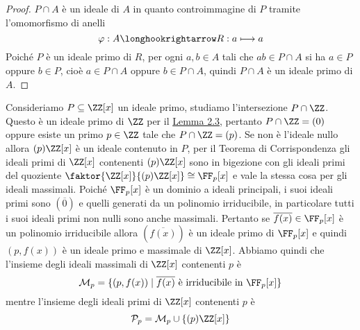 \documentclass[11pt]{scrartcl}
\begin{document}
\begin{proof}
    $P\cap A$ è un ideale di $A$ in quanto controimmagine di $P$ tramite
    l'omomorfismo di anelli
    \[
        \varphi: A \longhookrightarrow R: a \longmapsto a
    \]
    Poiché $P$ è un ideale primo di $R$, per ogni $a, b \in A$ tali che 
    $ab \in P\cap A$ si ha $a \in P$
    oppure $b \in P$, cioè $a \in P \cap A$ oppure $b \in P\cap A$, quindi
    $P \cap A$ è un ideale primo di $A$.
\end{proof}


Consideriamo $P \subseteq \ZZ[x]$ un ideale primo, studiamo l'intersezione
$P \cap \ZZ$. Questo è un ideale primo di $\ZZ$ per il 
\hyperref[lemma2.3]{Lemma 2.3}, pertanto $P\cap \ZZ = (0)$ oppure esiste un
primo $p \in \ZZ$ tale che $P\cap\ZZ = (p)$. Se non è l'ideale nullo allora
$(p)\ZZ[x]$ è un ideale contenuto in $P$, per il Teorema di 
Corrispondenza gli ideali primi di $\ZZ[x]$ contenenti $(p)\ZZ[x]$ sono in 
bigezione con gli ideali primi del quoziente $\faktor{\ZZ[x]}{(p)\ZZ[x]} \cong \FF_p[x]$
e vale la stessa cosa per gli ideali massimali. 
Poiché $\FF_p[x]$ è un dominio a ideali principali, i suoi ideali primi 
sono $(\overline{0})$ e quelli generati da un polinomio irriducibile, in particolare
tutti i suoi ideali primi non nulli sono anche massimali. Pertanto se $\overline{f(x)} \in \FF_p[x]$ è un polinomio
irriducibile allora $(\overline{f(x)})$ è un ideale primo di $\FF_p[x]$
e quindi $(p, f(x))$ è un ideale primo e massimale di $\ZZ[x]$. Abbiamo quindi che 
l'insieme degli ideali massimali di $\ZZ[x]$ contenenti $p$ è
\[
    \mathcal{M}_p = \{(p, f(x))\mid \overline{f(x)}\text{ è irriducibile in }
    \FF_p[x]\}
\]
mentre l'insieme degli ideali primi di $\ZZ[x]$ contenenti $p$ è
\[
    \mathcal{P}_p = \mathcal{M}_p \cup\{(p)\ZZ[x]\}
\]
\end{document}
